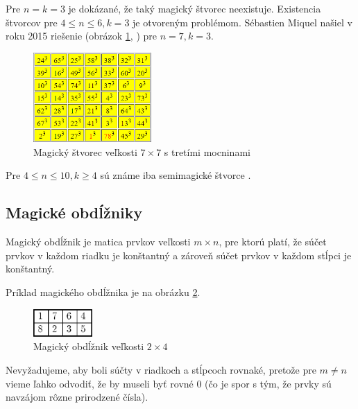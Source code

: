 Pre $n = k = 3$ je dokázané, že taký magický štvorec neexistuje. Existencia štvorcov pre $4 \leq n \leq 6, k = 3$ je otvoreným problémom. Sébastien Miquel našiel v roku 2015 riešenie (obrázok \ref{obr:fig_miquel_magic_7x7}, \cite{multimagie}) pre $n = 7, k = 3$.

\begin{figure}[H]
\centerline{\includegraphics[width=0.4\textwidth]{images/miquel_magic_7x7}}
\caption[Magický štvorec veľkosti $7 \times 7$ s tretími mocninami]{Magický štvorec veľkosti $7 \times 7$ s tretími mocninami \cite{multimagie}}
\label{obr:fig_miquel_magic_7x7}
\end{figure}

Pre $4 \leq n \leq 10, k \geq 4$ sú známe iba semimagické štvorce \cite{multimagie}. \\

\subsection{Magické obdĺžniky}
\begin{subdefinition} Magický obdĺžnik je matica prvkov veľkosti $m \times n$, pre ktorú platí, že súčet prvkov v každom riadku je konštantný a zároveň súčet prvkov v každom stĺpci je konštantný.
\end{subdefinition}

Príklad magického obdĺžnika je na obrázku \ref{obr:fig_trenkler_magic_2x4}.

\begin{figure}[H]
\centerline{\includegraphics[width=0.2\textwidth]{images/trenkler_magic_2x4}}
\caption[Magický obdĺžnik veľkosti $2 \times 4$]{Magický obdĺžnik veľkosti $2 \times 4$ \cite{rectangles}}
\label{obr:fig_trenkler_magic_2x4}
\end{figure}

Nevyžadujeme, aby boli súčty v riadkoch a stĺpcoch rovnaké, pretože pre $m \neq n$ vieme ľahko odvodiť, že by museli byť rovné $0$ (čo je spor s tým, že prvky sú navzájom rôzne prirodzené čísla). \\

